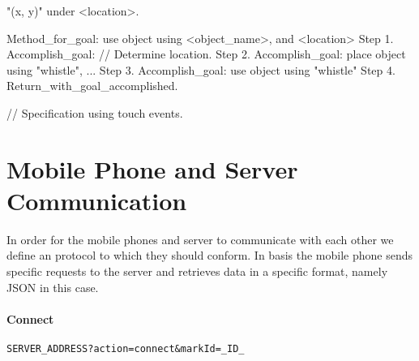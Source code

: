 \documentclass[a4paper,11pt]{report}
\begin{document}
	"(x, y)" under <location>.
	


Method_for_goal: use object using <object_name>, and <location>
	Step 1. Accomplish_goal: // Determine location.
	Step 2. Accomplish_goal: place object using "whistle", ...
	Step 3. Accomplish_goal: use object using "whistle"
	Step 4. Return_with_goal_accomplished.

// Specification using touch events.

	\section{Mobile Phone and Server Communication}
	In order for the mobile phones and server to communicate with each other we define an protocol to which they should conform. In basis the mobile phone sends specific requests to the server and retrieves data in a specific format, namely JSON in this case.
	
	\paragraph{Connect}
	\texttt{SERVER_ADDRESS?action=connect&markId=_ID_}
	
	
\end{document}
